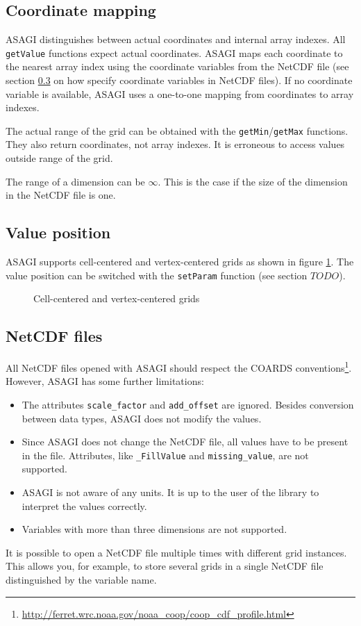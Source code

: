 \subsection{Coordinate mapping}

ASAGI distinguishes between actual coordinates and internal array indexes. All \texttt{getValue} functions expect actual coordinates. ASAGI maps each coordinate to the nearest array index using the coordinate variables from the NetCDF file (see section \ref{sec:netcdf files} on how specify coordinate variables in NetCDF files). If no coordinate variable is available, ASAGI uses a one-to-one mapping from coordinates to array indexes.

The actual range of the grid can be obtained with the \texttt{getMin}/\texttt{getMax} functions. They also return coordinates, not array indexes. It is erroneous to access values outside range of the grid.

The range of a dimension can be $\infty$. This is the case if the size of the dimension in the NetCDF file is one.

\subsection{Value position}

ASAGI supports cell-centered and vertex-centered grids as shown in figure \ref{fig:cell-centered vertex-centered}. The value position can be switched with the \texttt{setParam} function (see section $TODO$).

\begin{figure}[h]
 \def\xwidth{7}
 \def\ywidth{5}
 \def\scale{0.7}
 \centering
  \qquad
 \caption{Cell-centered and vertex-centered grids}
 \label{fig:cell-centered vertex-centered}
\end{figure}


\subsection{NetCDF files}
\label{sec:netcdf files}

All NetCDF files opened with ASAGI should respect the COARDS conventions\footnote{\url{http://ferret.wrc.noaa.gov/noaa_coop/coop_cdf_profile.html}}. However, ASAGI has some further limitations:
\begin{itemize}
 \item The attributes \texttt{scale\_factor} and \texttt{add\_offset} are ignored. Besides conversion between data types, ASAGI does not modify the values.
 \item Since ASAGI does not change the NetCDF file, all values have to be present in the file. Attributes, like \texttt{\_FillValue} and \texttt{missing\_value}, are not supported.
 \item ASAGI is not aware of any units. It is up to the user of the library to interpret the values correctly.
 \item Variables with more than three dimensions are not supported.
\end{itemize}

It is possible to open a NetCDF file multiple times with different grid instances. This allows you, for example, to store several grids in a single NetCDF file distinguished by the variable name.

